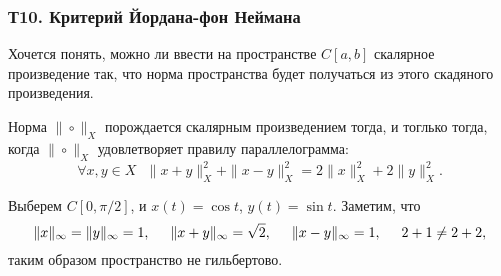 \subsubsection*{Т10. Критерий Йордана-фон Неймана}


Хочется понять, можно ли ввести на пространстве $C[a,b]$ скалярное произведение так, что норма пространства будет получаться из этого скадяного произведения.

\begin{to_thr}
    Норма $\|\circ\|_X$ порождается скалярным произведением тогда, и тоглько тогда, когда
    $\|\circ\|_X$ удовлетворяет правилу параллелограмма:
    \begin{equation*}
        \forall x, y \in X \ \ \ 
        \|x+y\|^2_X + \|x-y\|^2_X = 2 \|x\|_X^2 + 2 \|y\|_X^2.
    \end{equation*}
\end{to_thr}

\noindent
Выберем $C[0, \pi/2]$, и $x(t) = \cos t$, $y(t) = \sin t $. Заметим, что
\begin{equation*}
    \|x\|_{\infty} = \|y\|_{\infty} = 1,
    \hspace{5 mm}
    \|x+y\|_{\infty} = \sqrt{2}, \hspace{5 mm} \|x-y\|_\infty = 1,
    \hspace{5 mm} 
    2+1 \neq 2+2,
\end{equation*}
таким образом пространство не гильбертово.

